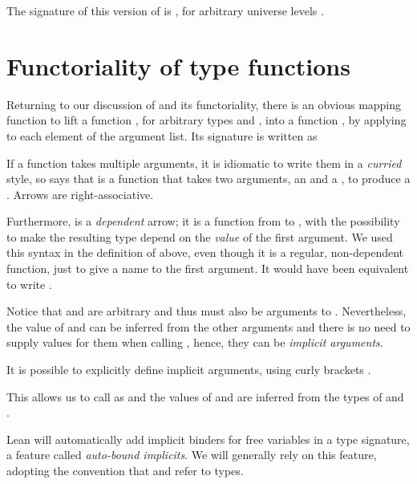 The signature of this version of  is , for arbitrary universe levels .

\section{Functoriality of type functions}

Returning to our discussion of  and its functoriality, there is an obvious mapping function to lift a function , for arbitrary types  and , into a function , by applying  to each element of the argument list. Its signature is written as
\begin{center}
\end{center}

\begin{remark}
    If a function takes multiple arguments, it is idiomatic to write them in a \emph{curried} style,
    so  says that  is a function that takes two arguments, an  and a , to produce a . Arrows are right-associative.

    Furthermore,  is a \emph{dependent} arrow; it is a function from  to , with the possibility to make the resulting type depend on the \emph{value}  of the first argument. 
    We used this syntax in the definition of  above, even though it is a regular, non-dependent function, just to give a name to the first argument. 
    It would have been equivalent to write .

    Notice that  and  are arbitrary and thus must also be arguments to . 
    Nevertheless, the value of  and  can be inferred from the other arguments and there is no need to supply values for them when calling , hence, they can be \emph{implicit arguments}. 
    
    It is possible to explicitly define implicit arguments, using curly brackets .
    \begin{center}
    \end{center}
    This allows us to call  as  and the values of  and  are inferred
    from the types of  and .

    Lean will automatically add implicit binders for free variables in a type signature,
    a feature called \emph{auto-bound implicits}. 
    We will generally rely on this feature, adopting the convention that  and  refer to types.
\end{remark}


